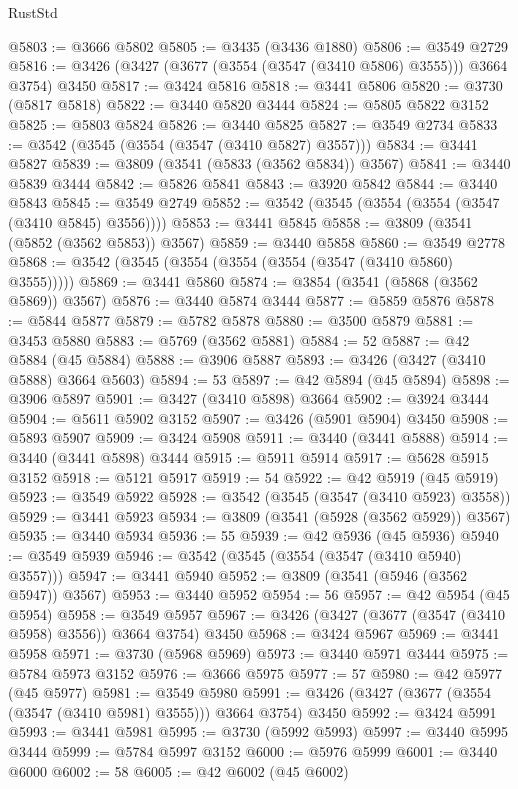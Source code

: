 \begin{lexlean}{RustStd}
\begin{coremodule}
@5803 := @3666 @5802
@5805 := @3435 (@3436 @1880)
@5806 := @3549 @2729
@5816 := @3426 (@3427 (@3677 (@3554 (@3547 (@3410 @5806) @3555))) @3664 @3754) @3450
@5817 := @3424 @5816
@5818 := @3441 @5806
@5820 := @3730 (@5817 @5818)
@5822 := @3440 @5820 @3444
@5824 := @5805 @5822 @3152
@5825 := @5803 @5824
@5826 := @3440 @5825
@5827 := @3549 @2734
@5833 := @3542 (@3545 (@3554 (@3547 (@3410 @5827) @3557)))
@5834 := @3441 @5827
@5839 := @3809 (@3541 (@5833 (@3562 @5834)) @3567)
@5841 := @3440 @5839 @3444
@5842 := @5826 @5841
@5843 := @3920 @5842
@5844 := @3440 @5843
@5845 := @3549 @2749
@5852 := @3542 (@3545 (@3554 (@3554 (@3547 (@3410 @5845) @3556))))
@5853 := @3441 @5845
@5858 := @3809 (@3541 (@5852 (@3562 @5853)) @3567)
@5859 := @3440 @5858
@5860 := @3549 @2778
@5868 := @3542 (@3545 (@3554 (@3554 (@3554 (@3547 (@3410 @5860) @3555)))))
@5869 := @3441 @5860
@5874 := @3854 (@3541 (@5868 (@3562 @5869)) @3567)
@5876 := @3440 @5874 @3444
@5877 := @5859 @5876
@5878 := @5844 @5877
@5879 := @5782 @5878
@5880 := @3500 @5879
@5881 := @3453 @5880
@5883 := @5769 (@3562 @5881)
@5884 := 52
@5887 := @42 @5884 (@45 @5884)
@5888 := @3906 @5887
@5893 := @3426 (@3427 (@3410 @5888) @3664 @5603)
@5894 := 53
@5897 := @42 @5894 (@45 @5894)
@5898 := @3906 @5897
@5901 := @3427 (@3410 @5898) @3664
@5902 := @3924 @3444
@5904 := @5611 @5902 @3152
@5907 := @3426 (@5901 @5904) @3450
@5908 := @5893 @5907
@5909 := @3424 @5908
@5911 := @3440 (@3441 @5888)
@5914 := @3440 (@3441 @5898) @3444
@5915 := @5911 @5914
@5917 := @5628 @5915 @3152
@5918 := @5121 @5917
@5919 := 54
@5922 := @42 @5919 (@45 @5919)
@5923 := @3549 @5922
@5928 := @3542 (@3545 (@3547 (@3410 @5923) @3558))
@5929 := @3441 @5923
@5934 := @3809 (@3541 (@5928 (@3562 @5929)) @3567)
@5935 := @3440 @5934
@5936 := 55
@5939 := @42 @5936 (@45 @5936)
@5940 := @3549 @5939
@5946 := @3542 (@3545 (@3554 (@3547 (@3410 @5940) @3557)))
@5947 := @3441 @5940
@5952 := @3809 (@3541 (@5946 (@3562 @5947)) @3567)
@5953 := @3440 @5952
@5954 := 56
@5957 := @42 @5954 (@45 @5954)
@5958 := @3549 @5957
@5967 := @3426 (@3427 (@3677 (@3547 (@3410 @5958) @3556)) @3664 @3754) @3450
@5968 := @3424 @5967
@5969 := @3441 @5958
@5971 := @3730 (@5968 @5969)
@5973 := @3440 @5971 @3444
@5975 := @5784 @5973 @3152
@5976 := @3666 @5975
@5977 := 57
@5980 := @42 @5977 (@45 @5977)
@5981 := @3549 @5980
@5991 := @3426 (@3427 (@3677 (@3554 (@3547 (@3410 @5981) @3555))) @3664 @3754) @3450
@5992 := @3424 @5991
@5993 := @3441 @5981
@5995 := @3730 (@5992 @5993)
@5997 := @3440 @5995 @3444
@5999 := @5784 @5997 @3152
@6000 := @5976 @5999
@6001 := @3440 @6000
@6002 := 58
@6005 := @42 @6002 (@45 @6002)

\end{coremodule}
\end{lexlean}
